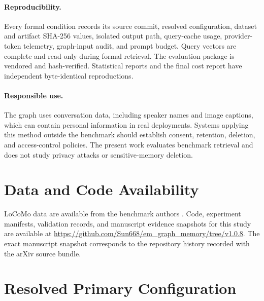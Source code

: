 \documentclass[10pt,twocolumn]{article}
\begin{document}
\paragraph{Reproducibility.}
Every formal condition records its source commit, resolved configuration,
dataset and artifact SHA-256 values, isolated output path, query-cache usage,
provider-token telemetry, graph-input audit, and prompt budget. Query vectors
are complete and read-only during formal retrieval. The evaluation package is
vendored and hash-verified. Statistical reports and the final cost report have
independent byte-identical reproductions.

\paragraph{Responsible use.}
The graph uses conversation data, including speaker names and image captions,
which can contain personal information in real deployments. Systems applying
this method outside the benchmark should establish consent, retention,
deletion, and access-control policies. The present work evaluates benchmark
retrieval and does not study privacy attacks or sensitive-memory deletion.

\section*{Data and Code Availability}

LoCoMo data are available from the benchmark authors
\citep{maharana2024locomo}. Code, experiment manifests, validation records,
and manuscript evidence snapshots for this study are available at
\url{https://github.com/Sun668/em_graph_memory/tree/v1.0.8}. The exact manuscript snapshot
corresponds to the repository history recorded with the arXiv source bundle.

\begingroup
\small


\endgroup

\appendix
\onecolumn

\section{Resolved Primary Configuration}
\label{app:config}
\end{document}
